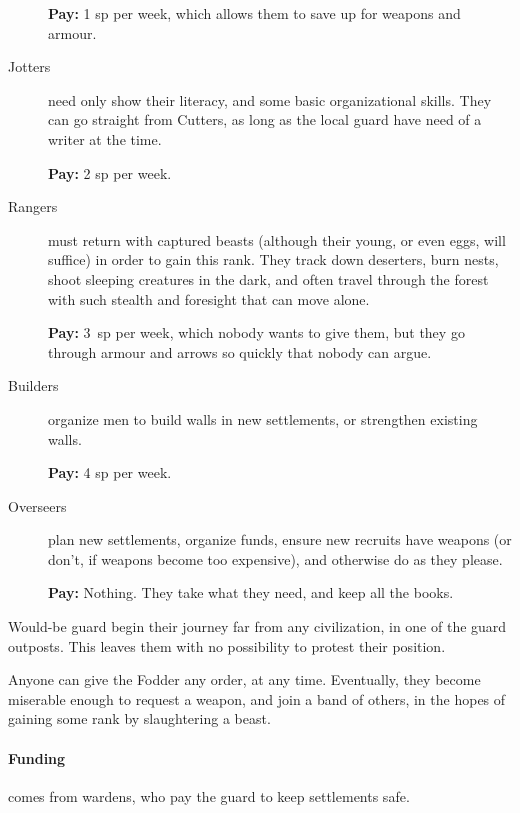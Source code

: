 \begin{multicols}{2}
\begin{description}
  \textbf{Pay:} 1 \gls{sp} per week, which allows them to save up for weapons and armour.

  \item[Jotters]
  need only show their literacy, and some basic organizational skills.
  They can go straight from Cutters, as long as the local \gls{guard} have need of a writer at the time.

  \textbf{Pay:} 2 \gls{sp} per week.

  \item[Rangers]
  must return with captured beasts (although their young, or even eggs, will suffice) in order to gain this rank.
  They track down deserters, burn nests, shoot sleeping creatures in the dark, and often travel through the forest with such stealth and foresight that can move alone.
  
  \textbf{Pay:} 3~\gls{sp} per week, which nobody wants to give them, but they go through armour and arrows so quickly that nobody can argue.

  \item[Builders]
  organize men to build walls in new settlements, or strengthen existing walls.

  \textbf{Pay:} 4 \gls{sp} per week.

  \item[Overseers]
  plan new settlements, organize funds, ensure new recruits have weapons (or don't, if weapons become too expensive), and otherwise do as they please.

  \textbf{Pay:} Nothing.
  They take what they need, and keep all the books.

\end{description}

\noindent
Would-be \gls{guard} begin their journey far from any civilization, in one of the \gls{guard} outposts.
This leaves them with no possibility to protest their position.

Anyone can give the Fodder any order, at any time.
Eventually, they become miserable enough to request a weapon, and join a band of others, in the hopes of gaining some rank by slaughtering a beast.

\paragraph{Funding}
comes from wardens, who pay the guard to keep settlements safe.


\end{multicols}
